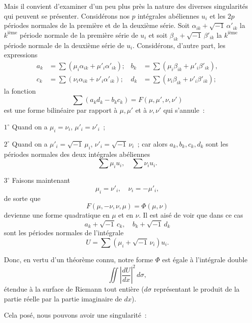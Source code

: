 \documentclass{article}
\begin{document}
Mais il convient d'examiner d'un peu plus près la nature des diverses singularités qui peuvent se présenter. Considérons nos $p$ intégrales abéliennes $u_{i}$ et les $2p$ périodes normales de la première et de la deuxième série. Soit $\alpha_{ik} + \sqrt{-1}\,\alpha'_{ik}$ la $k^{\text{ième}}$ période normale de la première série de $u_{i}$ et soit $\beta_{ik} + \sqrt{-1}\,\beta'_{ik}$ la $k^{\text{ième}}$ période normale de la
deuxième série de $u_{i}$. Considérons, d'autre part, les expressions
\[
\begin{aligned}
a_{k} &= \sum (\mu_{i} \alpha_{ik} + \mu'_{i} \alpha'_{ik}); & b_{k} &= \sum (\mu_{i} \beta_{ik} + \mu'_{i} \beta'_{ik}), \\
c_{k} &= \sum (\nu_{i} \alpha_{ik} + \nu'_{i} \alpha'_{ik}); & d_{k} &= \sum (\nu_{i} \beta_{ik} + \nu'_{i} \beta'_{ik});
\end{aligned}
\]
la fonction
\[
\sum (a_{k} d_{k} - b_{k} c_{k}) = F(\mu, \mu', \nu, \nu')
\]
est une forme bilinéaire par rapport à $\mu, \mu'$ et à $\nu, \nu'$ qui s'annule~:

$1^\circ$ Quand on a $\mu_{i} = \nu_{i}$, $\mu'_{i} = \nu'_{i}$~;

$2^\circ$ Quand on a $\mu'_{i} = \sqrt{-1}\,\mu_{i}$, $\nu'_{i} = \sqrt{-1}\,\nu_{i}$~; car alors $a_{k}, b_{k}, c_{k}, d_{k}$ sont les périodes normales des deux intégrales abéliennes
\[
\sum \mu_{i} u_{i}, \quad \sum \nu_{i} u_{i}.
\]

$3^\circ$ Faisons maintenant
\[
\mu_{i} = \nu'_{i}, \quad \nu_{i} = -\mu'_{i},
\]
de sorte que
\[
F(\mu, -\nu, \nu, \mu) = \Phi(\mu, \nu)
\]
devienne une forme quadratique en $\mu$ et en $\nu$. Il est aisé de voir que dans ce cas
\[
a_{k} + \sqrt{-1}\,c_{k}, \quad b_{k} + \sqrt{-1}\,d_{k}
\]
sont les périodes normales de l'intégrale
\[
U = \sum (\mu_{i} + \sqrt{-1}\,\nu_{i}) u_{i}.
\]

Donc, en vertu d'un théorème connu, notre forme $\Phi$ est égale à l'intégrale double
\[
\iint \left| \frac{dU}{dx} \right|^{2} \,d\sigma, \tag{3}
\]
étendue à la surface de Riemann tout entière ($d\sigma$ représentant le produit de la partie réelle par la partie imaginaire de $dx$).

Cela posé, nous pouvons avoir une singularité~:
\end{document}
